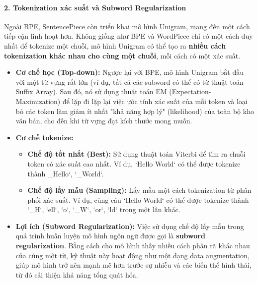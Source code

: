 \paragraph{2. Tokenization xác suất và Subword Regularization}
Ngoài BPE, SentencePiece còn triển khai mô hình Unigram, mang đến một cách tiếp cận linh hoạt hơn. Không giống như BPE và WordPiece chỉ có một cách duy nhất để tokenize một chuỗi, mô hình Unigram có thể tạo ra \textbf{nhiều cách tokenization khác nhau cho cùng một chuỗi}, mỗi cách có một xác suất.

\begin{itemize}
    \item \textbf{Cơ chế học (Top-down):} Ngược lại với BPE, mô hình Unigram bắt đầu với một từ vựng rất lớn (ví dụ, tất cả các subword có thể có từ thuật toán Suffix Array). Sau đó, nó sử dụng thuật toán EM (Expectation-Maximization) để lặp đi lặp lại việc ước tính xác suất của mỗi token và loại bỏ các token làm giảm ít nhất "khả năng hợp lý" (likelihood) của toàn bộ kho văn bản, cho đến khi từ vựng đạt kích thước mong muốn.
    
    \item \textbf{Cơ chế tokenize:}
        \begin{itemize}
            \item \textbf{Chế độ tốt nhất (Best):} Sử dụng thuật toán Viterbi để tìm ra chuỗi token có xác suất cao nhất. Ví dụ, `Hello World` có thể được tokenize thành \_Hello`, `\_World`.
            \item \textbf{Chế độ lấy mẫu (Sampling):} Lấy mẫu một cách tokenization từ phân phối xác suất. Ví dụ, cùng câu `Hello World` có thể được tokenize thành `\_H`, `ell`, `o`, `\_W`, `or`, `ld` trong một lần khác.
        \end{itemize}
    
    \item \textbf{Lợi ích (Subword Regularization):} Việc sử dụng chế độ lấy mẫu trong quá trình huấn luyện mô hình ngôn ngữ được gọi là \textbf{subword regularization}. Bằng cách cho mô hình thấy nhiều cách phân rã khác nhau của cùng một từ, kỹ thuật này hoạt động như một dạng data augmentation, giúp mô hình trở nên mạnh mẽ hơn trước sự nhiễu và các biến thể hình thái, từ đó cải thiện khả năng tổng quát hóa.
\end{itemize}

